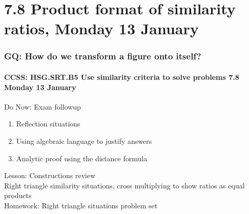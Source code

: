 \documentclass{beamer}
\begin{document}
\section{7.8 Product format of similarity ratios, Monday 13 January}
\frame
{
  \frametitle{GQ: How do we transform a figure onto itself?}
  \framesubtitle{CCSS: HSG.SRT.B5 Use similarity criteria to solve problems \hfill \alert{7.8 Monday 13 January}}

  \begin{block}{Do Now: Exam followup}
  \begin{enumerate}
    \item Reflection situations
    \item Using algebraic language to justify answers
    \item Analytic proof using the distance formula
  \end{enumerate}
  \end{block}
  Lesson: Constructions review \\[0.25cm]
  Right triangle similarity situations, cross multiplying to show ratios as equal products \\[0.5cm]
  Homework: Right triangle situations problem set
}
\end{document}
